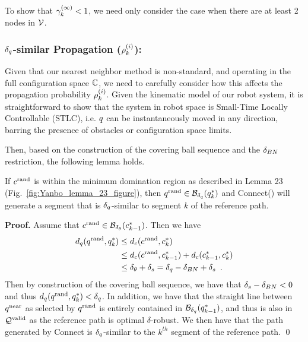 To show that $\gamma_k^{(\infty)} < 1$, we need only consider the case when there are at least 2 nodes in $\mathcal{V}$.

\subsubsection{$\delta_q$-similar Propagation ($\rho_k^{(i)}$):}
\label{sec:prop}
Given that our nearest neighbor method is non-standard, and operating in the full configuration space $\mathbb{C}$, we need to carefully consider how this affects the propagation probability $\rho_k^{(i)}$. Given the kinematic model of our robot system, it is straightforward to show that the system in robot space is Small-Time Locally Controllable (STLC), i.e. $q$ can be instantaneously moved in any direction, barring the presence of obstacles or configuration space limits.  

Then, based on the construction of the covering ball sequence and the $\delta_{BN}$ restriction, the following lemma holds.

\begin{lemma}
    \label{lem:rand_to_next_dist}
    If $c^\textrm{rand}$ is within the minimum domination region as described in \cite{LiAOKP2016} Lemma 23 (Fig.~\ref{fig:Yanbo_lemma_23_figure}), then $q^\textrm{rand} \in \mathcal{B}_{\delta_q}(q^*_k)$ and Connect() will generate a segment that is $\delta_q$-similar to segment $k$ of the reference path.
\end{lemma}



\noindent
{\bf Proof.}
Assume that $c^\textrm{rand} \in \mathcal{B}_{\delta_\theta}(c^*_{k-1})$. Then we have
\begin{align*}
    d_q(q^\textrm{rand}, q^*_k)  &\leq d_c(c^\textrm{rand}, c^*_k) \\
                                                        &\leq d_c(c^\textrm{rand}, c^*_{k-1}) + d_c(c^*_{k-1}, c^*_k) \\
                                                        &\leq \delta_\theta + \delta_s = \delta_q - \delta_{BN} + \delta_s \enspace.
\end{align*}
Then by construction of the covering ball sequence, we have that $\delta_s -\delta_{BN} < 0$ and thus $d_q(q^\textrm{rand}, q^*_k) < \delta_q$. In addition, we have that the straight line between $q^\textrm{near}$ as selected by $q^\textrm{rand}$ is entirely contained in $\mathcal{B}_{\delta_q}(q^*_{k-1})$, and thus is also in $\mathcal{Q}^{\textrm{valid}}$ as the reference path is optimal $\delta$-robust. We then have that the path generated by Connect is $\delta_q$-similar to the $k^{th}$ segment of the reference path.
\qed

